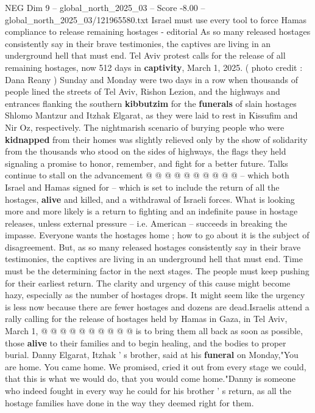 \begin{textsample}{NEG Dim 9 – global\_north\_2025\_03 – Score -8.00 – global\_north\_2025\_03/121965580.txt}  \label{ex:f9_neg_143}
Israel must use every tool to force Hamas compliance to release remaining hostages - editorial As so many released hostages consistently say in their brave testimonies, the captives are living in an underground hell that must end.
Tel Aviv protest calls for the release of all remaining hostages, now 512 days in \textbf{captivity}, March 1, 2025. ( photo credit : Dana Reany ) Sunday and Monday were two days in a row when thousands of people lined the streets of Tel Aviv, Rishon Lezion, and the highways and entrances flanking the southern \textbf{kibbutzim} for the \textbf{funerals} of slain hostages Shlomo Mantzur and Itzhak Elgarat, as they were laid to rest in Kissufim and Nir Oz, respectively.
The nightmarish scenario of burying people who were \textbf{kidnapped} from their homes was slightly relieved only by the show of solidarity from the thousands who stood on the sides of highways, the flags they held signaling a promise to honor, remember, and fight for a better future.
Talks continue to stall on the advancement @ @ @ @ @ @ @ @ @ @ -- which both Israel and Hamas signed for -- which is set to include the return of all the hostages, \textbf{alive} and killed, and a withdrawal of Israeli forces.
What is looking more and more likely is a return to fighting and an indefinite pause in hostage releases, unless external pressure -- i.e.
American -- succeeds in breaking the impasse.
Everyone wants the hostages home ; how to go about it is the subject of disagreement.
But, as so many released hostages consistently say in their brave testimonies, the captives are living in an underground hell that must end.
Time must be the determining factor in the next stages.
The people must keep pushing for their earliest return.
The clarity and urgency of this cause might become hazy, especially as the number of hostages drops.
It might seem like the urgency is less now because there are fewer hostages and dozens are dead.Israelis attend a rally calling for the release of hostages held by Hamas in Gaza, in Tel Aviv, March 1, @ @ @ @ @ @ @ @ @ @ is to bring them all back as soon as possible, those \textbf{alive} to their families and to begin healing, and the bodies to proper burial.
Danny Elgarat, Itzhak ' s brother, said at his \textbf{funeral} on Monday,"You are home.
You came home.
We promised, cried it out from every stage we could, that this is what we would do, that you would come home."Danny is someone who indeed fought in every way he could for his brother ' s return, as all the hostage families have done in the way they deemed right for them.

\end{textsample}
